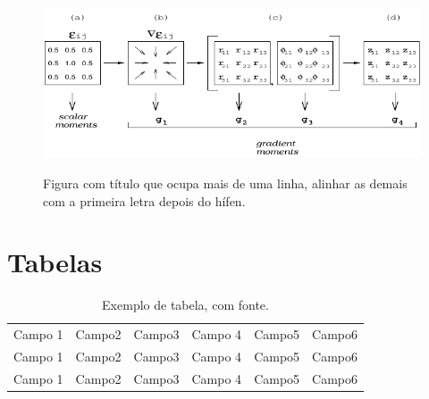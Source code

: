 \begin{figure}[!h]
	\caption{Figura com título que ocupa mais de uma linha, alinhar as demais com a primeira
letra depois do hífen.}
	\vspace{6mm}	%
	\begin{center}
    	\includegraphics[width=\mylenfig]{./Figuras2/gpa.pdf}  
	\end{center}
	\vspace{4mm}	%
	\label{figgpa2}
\end{figure}

\clearpage
\section{Tabelas} 

\begin{table}[!ht]%
  \begin{center}	%
  \caption{Exemplo de tabela, com fonte.}
    \begin{tabular}{l|l|c|c|r|r}
			\hline %
				Campo 1 & Campo2 & Campo3 & Campo 4 & Campo5 & Campo6 \\
				Campo 1 & Campo2 & Campo3 & Campo 4 & Campo5 & Campo6 \\
				Campo 1 & Campo2 & Campo3 & Campo 4 & Campo5 & Campo6 \\				
			\hline %
    \end{tabular}
    \end{center}
\end{table}


